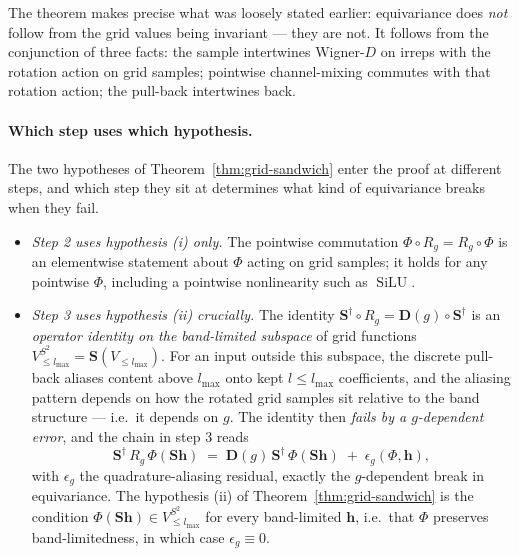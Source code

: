 \documentclass[11pt,a4paper]{article}
\DeclareMathOperator{\SiLU}{SiLU}
\newcommand{\Sph}{S^2}
\newcommand{\bh}{\bm{h}}
\newcommand{\bD}{\bm{D}}
\newcommand{\lmax}{l_{\max}}
\theoremstyle{plain}
\theoremstyle{definition}
\theoremstyle{remark}
\begin{document}
The theorem makes precise what was loosely stated earlier: equivariance does
\emph{not} follow from the grid values being invariant — they are not. It
follows from the conjunction of three facts: the sample intertwines Wigner-$D$
on irreps with the rotation action on grid samples; pointwise channel-mixing
commutes with that rotation action; the pull-back intertwines back.

\paragraph{Which step uses which hypothesis.}
The two hypotheses of Theorem~\ref{thm:grid-sandwich} enter the proof at
different steps, and which step they sit at determines what kind of
equivariance breaks when they fail.
\begin{itemize}[leftmargin=2em]
    \item \emph{Step 2 uses hypothesis (i) only.}
          The pointwise commutation $\Phi\circ R_g=R_g\circ\Phi$ is an elementwise statement about $\Phi$ acting on grid samples; it holds for any pointwise $\Phi$, including a pointwise nonlinearity such as $\SiLU$.
    \item \emph{Step 3 uses hypothesis (ii) crucially.}
          The identity $\bm{S}^{\dagger}\circ R_g=\bD(g)\circ\bm{S}^{\dagger}$ is an \emph{operator identity on the band-limited subspace} of grid functions $V^{\Sph}_{\le\lmax}=\bm{S}(V_{\le\lmax})$.
          For an input outside this subspace, the discrete pull-back aliases content above $\lmax$ onto kept $l\le\lmax$ coefficients, and the aliasing pattern depends on how the rotated grid samples sit relative to the band structure --- i.e.\ it depends on $g$.
          The identity then \emph{fails by a $g$-dependent error}, and the chain in step 3 reads
          \[
              \bm{S}^{\dagger}\,R_g\,\Phi(\bm{S}\bh)\;=\;\bD(g)\,\bm{S}^{\dagger}\,\Phi(\bm{S}\bh)\;+\;\epsilon_g(\Phi,\bh),
          \]
          with $\epsilon_g$ the quadrature-aliasing residual, exactly the $g$-dependent
          break in equivariance. The hypothesis (ii) of Theorem~\ref{thm:grid-sandwich}
          is the condition $\Phi(\bm{S}\bh)\in V^{\Sph}_{\le\lmax}$ for every
          band-limited $\bh$, i.e.\ that $\Phi$ preserves band-limitedness, in which case
          $\epsilon_g\equiv 0$.
\end{itemize}
\end{document}
